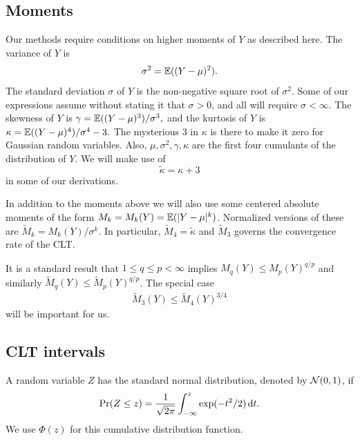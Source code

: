 \documentclass{article}
\begin{document}
\subsection{Moments}

Our methods require conditions on higher moments of
$Y$ as described here.
The variance of $Y$ is
$$ \sigma^2 = \mathbb{E}( (Y-\mu)^2 ).$$
The standard deviation $\sigma$ of $Y$ is
the non-negative square root of $\sigma^2$.
Some of our expressions assume without
stating it that $\sigma>0$,
and all will require $\sigma<\infty$.
The skewness of $Y$ is
$ \gamma = \mathbb{E}( (Y-\mu)^3 )/\sigma^3,$
and the kurtosis of $Y$ is
$ \kappa = \mathbb{E}( (Y-\mu)^4)/\sigma^4-3.$
The mysterious $3$ in $\kappa$ is there to
make it zero for Gaussian random variables.
Also, $\mu,\sigma^2,\gamma,\kappa$ are the
first four cumulants \cite{mccu:1987} of the distribution of $Y$.
We will make use of
$$
\tilde\kappa = \kappa + 3
$$
in some of our derivations.

In addition to the moments above we will also
use some centered absolute moments
of the form $M_k=M_k(Y) = \mathbb{E}( |Y-\mu|^k)$.
Normalized versions of these are
$\widetilde M_k=M_k(Y)/\sigma^k$.
In particular, $\widetilde M_4 = \tilde\kappa$
and $\widetilde M_3$ governs the convergence rate
of the CLT.

It is a standard result that $1\le q\le p<\infty$
implies $M_q(Y) \le M_p(Y)^{q/p}$
and similarly
 $\widetilde M_q(Y) \le \widetilde M_p(Y)^{q/p}$.
The special case 
\begin{align}\label{eq:boundm3}
\widetilde M_3(Y) \le \widetilde M_4(Y)^{3/4}
\end{align}
will be important for us.

\subsection{CLT intervals}

A random variable $Z$ has the standard normal distribution,
denoted by $\mathcal{N}(0,1)$, if 
$$\Pr( Z\le z ) = \frac1{\sqrt{2\pi}}\int_{-\infty}^z
\exp(-t^2/2)\,\mathrm{d} t.$$
We use $\Phi(z)$ for this cumulative distribution function.
\end{document}
